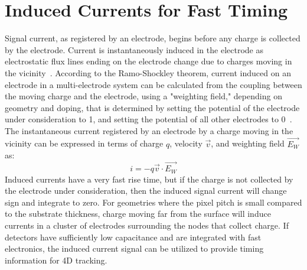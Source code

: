 \section{Induced Currents for Fast Timing}
Signal current, as registered by an electrode, begins before any charge is collected by the electrode.  
Current is instantaneously induced in the electrode as electrostatic flux lines ending on the electrode change due to charges moving in the vicinity~\cite{doi:10.1063/1.1710367}.
According to the Ramo-Shockley theorem, current induced on an electrode in a multi-electrode system can be calculated from the coupling between the moving charge and the electrode, using a "weighting field," depending on geometry and doping, that is determined by setting the potential of the electrode under consideration to 1, and setting the potential of all other electrodes to 0~\cite{1686997}.
The instantaneous current registered by an electrode by a charge moving in the vicinity can be expressed in terms of charge $q$, velocity $\vec{v}$, and weighting field $\vec{E_W}$ as:
\begin{equation}
i = -q \vec{v} \cdot \vec{E_W}
\end{equation}
Induced currents have a very fast rise time, but if the charge is not collected by the electrode under consideration, then the induced signal current will change sign and integrate to zero.
For geometries where the pixel pitch is small compared to the substrate thickness, charge moving far from the surface will induce currents in a cluster of electrodes surrounding the nodes that collect charge.
If detectors have sufficiently low capacitance and are integrated with fast electronics, the induced current signal can be utilized to provide timing information for 4D tracking.

